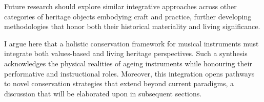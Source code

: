 Future research should explore similar integrative approaches across other categories of heritage objects embodying craft and practice, further developing methodologies that honor both their historical materiality and living significance. \cite{fritz_player_2012, fritz_soloist_2014, fritz_listener_2017}

I argue here that a holistic conservation framework for musical instruments must integrate both values-based and living heritage perspectives. Such a synthesis acknowledges the physical realities of ageing instruments while honouring their performative and instructional roles. Moreover, this integration opens pathways to novel conservation strategies that extend beyond current paradigms, a discussion that will be elaborated upon in subsequent sections.
